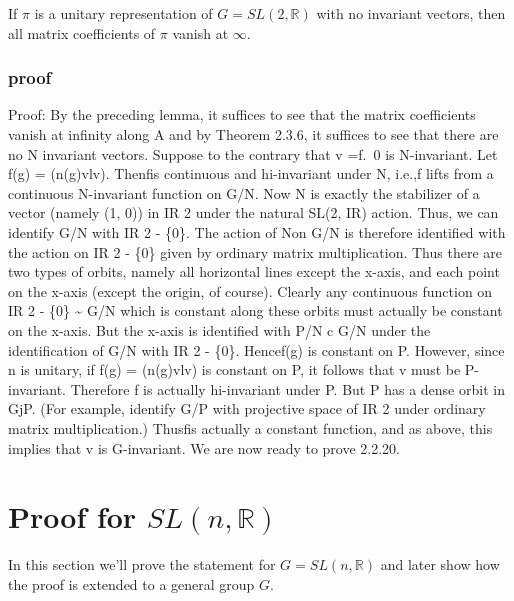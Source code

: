 \documentclass[
]{article}
\newcommand{\G}{\ensuremath{G}}
\newcommand{\slnr}{\ensuremath{SL(n, \mathbb{R})}}
\begin{document}
If \(\pi\) is a unitary representation of \(G = SL(2, \mathbb{R})\) with
no invariant vectors, then all matrix coefficients of \(\pi\) vanish at
\(\infty\).

\hypertarget{proof-2}{%
\subsubsection{proof}\label{proof-2}}


 
Proof: By
the preceding lemma, it suffices to see that the matrix coefficients
vanish at infinity along A and by Theorem 2.3.6, it suffices to see that
there are no N invariant vectors. Suppose to the contrary that v =f.~0
is N-invariant. Let f(g) = (n(g)vlv). Thenfis continuous and
hi-invariant under N, i.e.,f lifts from a continuous N-invariant
function on G/N. Now N is exactly the stabilizer of a vector (namely (1,
0)) in IR 2 under the natural SL(2, IR) action. Thus, we can identify
G/N with IR 2 - \{0\}. The action of Non G/N is therefore identified
with the action on IR 2 - \{0\} given by ordinary matrix multiplication.
Thus there are two types of orbits, namely all horizontal lines except
the x-axis, and each point on the x-axis (except the origin, of course).
Clearly any continuous function on IR 2 - \{0\} \textasciitilde{} G/N
which is constant along these orbits must actually be constant on the
x-axis. But the x-axis is identified with P/N c G/N under the
identification of G/N with IR 2 - \{0\}. Hencef(g) is constant on P.
However, since n is unitary, if f(g) = (n(g)vlv) is constant on P, it
follows that v must be P-invariant. Therefore f is actually hi-invariant
under P. But P has a dense orbit in GjP. (For example, identify G/P with
projective space of IR 2 under ordinary matrix multiplication.) Thusfis
actually a constant function, and as above, this implies that v is
G-invariant. We are now ready to prove 2.2.20.



\hypertarget{proof-for-slnr}{%
\section{Proof for \(SL(n, \mathbb{R})\)}
\label{proof-for-slnr}}

In this section we'll prove the statement for $G = \slnr$ and later show how the proof is extended to a general group \G.
\end{document}
